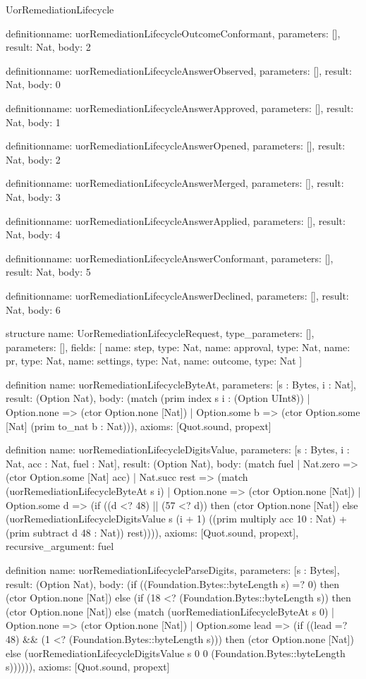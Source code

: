 \begin{lexlean}{UorRemediationLifecycle}
\begin{semanticmodule}
definition{name: uorRemediationLifecycleOutcomeConformant, parameters: [], result: Nat, body: 2}

definition{name: uorRemediationLifecycleAnswerObserved, parameters: [], result: Nat, body: 0}

definition{name: uorRemediationLifecycleAnswerApproved, parameters: [], result: Nat, body: 1}

definition{name: uorRemediationLifecycleAnswerOpened, parameters: [], result: Nat, body: 2}

definition{name: uorRemediationLifecycleAnswerMerged, parameters: [], result: Nat, body: 3}

definition{name: uorRemediationLifecycleAnswerApplied, parameters: [], result: Nat, body: 4}

definition{name: uorRemediationLifecycleAnswerConformant, parameters: [], result: Nat, body: 5}

definition{name: uorRemediationLifecycleAnswerDeclined, parameters: [], result: Nat, body: 6}

structure{
  name: UorRemediationLifecycleRequest,
  type_parameters: [],
  parameters: [],
  fields: [
    {name: step, type: Nat},
    {name: approval, type: Nat},
    {name: pr, type: Nat},
    {name: settings, type: Nat},
    {name: outcome, type: Nat}
  ]
}

definition{
  name: uorRemediationLifecycleByteAt,
  parameters: [s : Bytes, i : Nat],
  result: (Option Nat),
  body: (match (prim index s i : (Option UInt8))
    | Option.none => (ctor Option.none [Nat])
    | Option.some b => (ctor Option.some [Nat] (prim to_nat b : Nat))),
  axioms: [Quot.sound, propext]
}

definition{
  name: uorRemediationLifecycleDigitsValue,
  parameters: [s : Bytes, i : Nat, acc : Nat, fuel : Nat],
  result: (Option Nat),
  body: (match fuel
    | Nat.zero => (ctor Option.some [Nat] acc)
    | Nat.succ rest => (match (uorRemediationLifecycleByteAt s i)
      | Option.none => (ctor Option.none [Nat])
      | Option.some d => (if ((d <? 48) || (57 <? d)) then (ctor Option.none [Nat]) else (uorRemediationLifecycleDigitsValue s (i + 1) ((prim multiply acc 10 : Nat) + (prim subtract d 48 : Nat)) rest)))),
  axioms: [Quot.sound, propext],
  recursive_argument: fuel
}

definition{
  name: uorRemediationLifecycleParseDigits,
  parameters: [s : Bytes],
  result: (Option Nat),
  body: (if ((Foundation.Bytes::byteLength s) =? 0) then (ctor Option.none [Nat]) else (if (18 <? (Foundation.Bytes::byteLength s)) then (ctor Option.none [Nat]) else (match (uorRemediationLifecycleByteAt s 0)
    | Option.none => (ctor Option.none [Nat])
    | Option.some lead => (if ((lead =? 48) && (1 <? (Foundation.Bytes::byteLength s))) then (ctor Option.none [Nat]) else (uorRemediationLifecycleDigitsValue s 0 0 (Foundation.Bytes::byteLength s)))))),
  axioms: [Quot.sound, propext]
}


\end{semanticmodule}
\end{lexlean}
